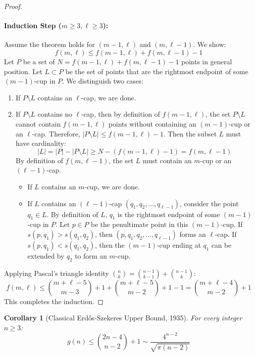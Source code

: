\documentclass[11pt,a4paper]{article}
\newtheorem{corollary}[theorem]{Corollary}
\theoremstyle{definition}
\begin{document}
\begin{proof}
\paragraph{Induction Step ($m \ge 3, \ell \ge 3$):}
Assume the theorem holds for $(m-1, \ell)$ and $(m, \ell-1)$. We show:
\begin{equation}\label{eq:pascal_rec}
f(m, \ell) \le f(m-1, \ell) + f(m, \ell-1) - 1
\end{equation}
Let $P$ be a set of $N = f(m-1, \ell) + f(m, \ell-1) - 1$ points in general position.
Let $L \subset P$ be the set of points that are the rightmost endpoint of some $(m-1)$-cup in $P$.
We distinguish two cases:
\begin{enumerate}
    \item If $P \setminus L$ contains an $\ell$-cap, we are done.
    \item If $P \setminus L$ contains no $\ell$-cap, then by definition of $f(m-1, \ell)$, the set $P \setminus L$ cannot contain $f(m-1, \ell)$ points without containing an $(m-1)$-cup or an $\ell$-cap.
    Therefore, $|P \setminus L| \le f(m-1, \ell) - 1$.
    Then the subset $L$ must have cardinality:
    \[ |L| = |P| - |P \setminus L| \ge N - (f(m-1, \ell) - 1) = f(m, \ell-1) \]
    By definition of $f(m, \ell-1)$, the set $L$ must contain an $m$-cup or an $(\ell-1)$-cap.
    \begin{itemize}
        \item If $L$ contains an $m$-cup, we are done.
        \item If $L$ contains an $(\ell-1)$-cap $(q_1, q_2, \dots, q_{\ell-1})$, consider the point $q_1 \in L$.
        By definition of $L$, $q_1$ is the rightmost endpoint of some $(m-1)$-cup in $P$.
        Let $p \in P$ be the penultimate point in this $(m-1)$-cup.
        If $s(p, q_1) > s(q_1, q_2)$, then $(p, q_1, q_2, \dots, q_{\ell-1})$ forms an $\ell$-cap.
        If $s(p, q_1) < s(q_1, q_2)$, then the $(m-1)$-cup ending at $q_1$ can be extended by $q_2$ to form an $m$-cup.
    \end{itemize}
\end{enumerate}
Applying Pascal's triangle identity $\binom{n}{k} = \binom{n-1}{k-1} + \binom{n-1}{k}$:
\[ f(m, \ell) \le \binom{m+\ell-5}{m-3} + 1 + \binom{m+\ell-5}{m-2} + 1 - 1 = \binom{m+\ell-4}{m-2} + 1 \]
This completes the induction.
\end{proof}

\begin{corollary}[Classical Erd\H{o}s-Szekeres Upper Bound, 1935]\label{cor:es_upper}
For every integer $n \ge 3$:
\begin{equation}\label{eq:es_upper}
g(n) \le \binom{2n - 4}{n - 2} + 1 \sim \frac{4^{n-2}}{\sqrt{\pi(n-2)}}
\end{equation}
\end{corollary}
\end{document}
